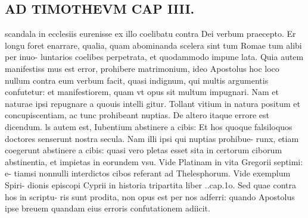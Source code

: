 \documentclass{article}
\begin{document}
\begin{pages}
\section*{AD TIMOTHEVM CAP IIII. }
\marginpar{[ p.93 ]}\pstart scandala in ecclesiis eurenisse ex illo coelibatu contra Dei verbum praecepto. Er longu foret enarrare, qualia, quam abominanda scelera sint tum Romae tum alibi per inuo- luntarios coelibes perpetrata, et quodammodo impune lata. Quia autem manifestiss mus est error, prohibere matrimonium, ideo Apostolus hoc loco nullum contra eum verbum facit, quasi indignum, qui multis argumentis confutetur: et manifestiorem, quam vt opus sit multum impugnari. Nam et naturae ipsi repugnare a quouis intelli gitur. Tollant vitium in natura positum et concupiscentiam, ac tunc prohibeant nuptias.  \pend\pstart De altero itaque errore est dicendum. ls autem est, Iubentium abstinere a cibis: Et hos quoque falsiloquos doctores senserunt nostra secula. Nam illi ipsi qui nuptias prohibue- runx, etiam coegerunt abstinere a cibis: quasi vero pletas esset sita in certorum ciborum abstinentia, et impietas in eorundem vsu. Vide Platinam in vita Gregorii septimi: e- tiamsi nonnulli interdictos cibos referant ad Thelesphorum. Vide exemplum Spiri- dionis episcopi Cyprii in historia tripartita liber ..cap.1o. Sed quae contra hos in scriptu- ris sunt prodita, non opus est per nos adferri: quando Apostolus ipse breuem quandam eius erroris confutationem adiicit.  \pend
{}
{}

\end{pages}
\end{document}
